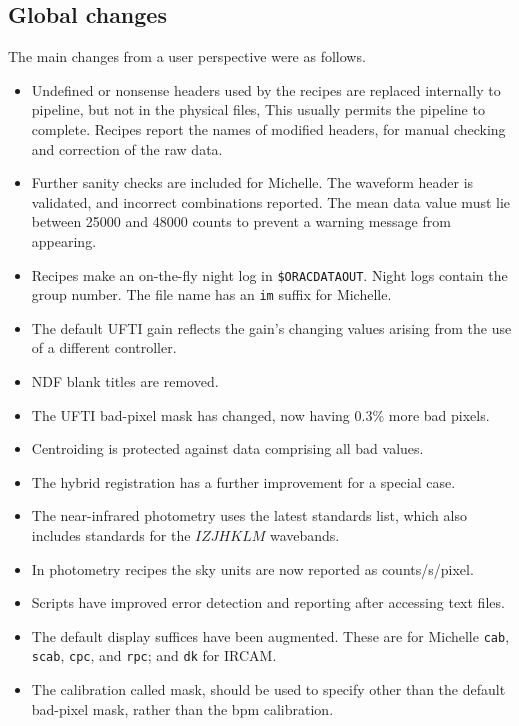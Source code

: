 \documentclass[twoside,11pt]{article}
\renewcommand{\_}{\texttt{\symbol{95}}}
\begin{document}
\subsection{Global changes}

The main changes from a user perspective were as follows.

\begin{itemize}
   \item Undefined or nonsense headers used by the recipes are
   replaced internally to pipeline, but not in the physical files,
   This usually permits the pipeline to complete.   Recipes report
   the names of modified headers, for manual checking and correction
   of the raw data. 
   
   \item Further sanity checks are included for Michelle.  The
   waveform header is validated, and incorrect combinations reported.
   The mean data value must lie between 25000 and 48000 counts to
   prevent a warning message from appearing.

   \item Recipes make an on-the-fly night log in {\tt \$ORAC\_DATA\_OUT}.
   Night logs contain the group number.  The file name has an
   {\tt \_im} suffix for Michelle.

   \item The default UFTI gain reflects the gain's changing values arising
   from the use of a different controller.
   
   \item NDF blank titles are removed.

   \item The UFTI bad-pixel mask has changed, now having 0.3\% more
   bad pixels.

   \item Centroiding is protected against data comprising all bad
   values.

   \item The hybrid registration has a further improvement for a special
   case.
   
   \item The near-infrared photometry uses the latest standards list,
   which also includes standards for the $IZJHKLM$ wavebands.  

   \item In photometry recipes the sky units are now reported as
   counts/s/pixel.

   \item Scripts have improved error detection and reporting after accessing
   text files.

   \item The default display suffices have been augmented.  These are
   for Michelle {\tt\_cab}, {\tt\_scab}, {\tt\_cpc}, and {\tt\_rpc}; and
   {\tt\_dk} for IRCAM.

   \item The calibration called mask, should be used to specify other
   than the default bad-pixel mask, rather than the bpm calibration.
\end{itemize}
\end{document}
